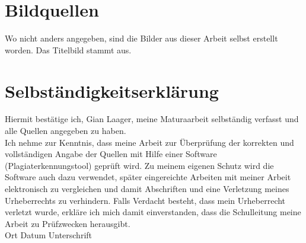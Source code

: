 \documentclass[11pt,DIV=10,final]{scrreprt} %
\begin{document}
\chapter*{Bildquellen}
%
Wo nicht anders angegeben, sind die Bilder aus dieser Arbeit selbst erstellt worden. Das Titelbild stammt aus.
%



%
\chapter*{Selbständigkeitserklärung}
%
Hiermit bestätige ich, Gian Laager, meine Maturaarbeit selbständig verfasst und alle Quellen angegeben zu haben.\\\newline
Ich nehme zur Kenntnis, dass meine Arbeit zur Überprüfung der korrekten und vollständigen Angabe der Quellen mit Hilfe einer Software (Plagiaterkennungstool) geprüft wird. Zu meinem eigenen Schutz wird die Software auch dazu verwendet, später eingereichte Arbeiten mit meiner Arbeit elektronisch zu vergleichen und damit Abschriften und eine Verletzung meines Urheberrechts zu verhindern. Falls Verdacht besteht, dass mein Urheberrecht verletzt wurde, erkläre ich mich damit einverstanden, dass die Schulleitung meine Arbeit zu Prüfzwecken herausgibt.\\\newline
Ort\hspace{4cm} Datum\hspace{4cm}  Unterschrift
%
\end{document}
